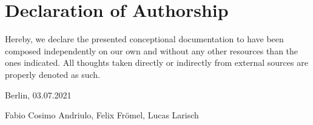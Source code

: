 \section*{Declaration of Authorship}

Hereby, we declare the presented conceptional documentation to have been composed independently on our own and without any other resources than the ones indicated.
All thoughts taken directly or indirectly from external sources are properly denoted as such.

\vspace{15mm}

{\setlength{\parindent}{0cm}
    Berlin, 03.07.2021

    Fabio Cosimo Andriulo,
    Felix Frömel,
    Lucas Larisch
}
